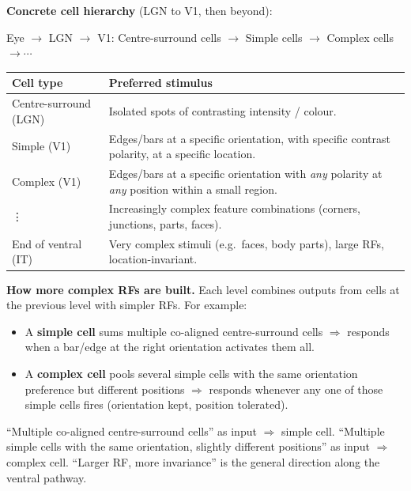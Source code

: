 \textbf{Concrete cell hierarchy} (LGN to V1, then beyond):
\begin{center}
Eye $\rightarrow$ LGN $\rightarrow$ V1: \quad Centre-surround cells $\rightarrow$ Simple cells $\rightarrow$ Complex cells $\rightarrow \cdots$
\end{center}

\begin{center}
\renewcommand{\arraystretch}{1.3}
\begin{tabular}{@{} l p{8.5cm} @{}}
\toprule
\textbf{Cell type} & \textbf{Preferred stimulus} \\
\midrule
Centre-surround (LGN) & Isolated spots of contrasting intensity / colour. \\
Simple (V1)           & Edges/bars at a specific orientation, with specific contrast polarity, at a specific location. \\
Complex (V1)          & Edges/bars at a specific orientation with \emph{any} polarity at \emph{any} position within a small region. \\
\vdots                & Increasingly complex feature combinations (corners, junctions, parts, faces). \\
End of ventral (IT)   & Very complex stimuli (e.g.\ faces, body parts), large RFs, location-invariant. \\
\bottomrule
\end{tabular}
\end{center}

\textbf{How more complex RFs are built.} Each level combines outputs from cells at the previous level with simpler RFs. For example:
\begin{itemize}
  \item A \textbf{simple cell} sums multiple co-aligned centre-surround cells $\Rightarrow$ responds when a bar/edge at the right orientation activates them all.
  \item A \textbf{complex cell} pools several simple cells with the same orientation preference but different positions $\Rightarrow$ responds whenever any one of those simple cells fires (orientation kept, position tolerated).
\end{itemize}

\begin{tipbox}
``Multiple co-aligned centre-surround cells'' as input $\Rightarrow$ simple cell. ``Multiple simple cells with the same orientation, slightly different positions'' as input $\Rightarrow$ complex cell. ``Larger RF, more invariance'' is the general direction along the ventral pathway.
\end{tipbox}


